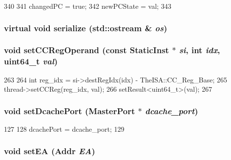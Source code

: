 \begin{DoxyCode}
340     {
341        changedPC = true;
342        newPCState = val;
343     }
\end{DoxyCode}
\hypertarget{classCheckerCPU_ad6272f80ae37e8331e3969b3f072a801}{
\subsubsection[{serialize}]{\setlength{\rightskip}{0pt plus 5cm}virtual void serialize (std::ostream \& {\em os})}}
\label{classCheckerCPU_ad6272f80ae37e8331e3969b3f072a801}
\hypertarget{classCheckerCPU_afeb2b876cf6b29215cf9d6d56ba8863b}{
\subsubsection[{setCCRegOperand}]{\setlength{\rightskip}{0pt plus 5cm}void setCCRegOperand (const {\bf StaticInst} $\ast$ {\em si}, \/  int {\em idx}, \/  uint64\_\-t {\em val})}}
\label{classCheckerCPU_afeb2b876cf6b29215cf9d6d56ba8863b}



\begin{DoxyCode}
263     {
264         int reg_idx = si->destRegIdx(idx) - TheISA::CC_Reg_Base;
265         thread->setCCReg(reg_idx, val);
266         setResult<uint64_t>(val);
267     }
\end{DoxyCode}
\hypertarget{classCheckerCPU_a8d77cc755c7a424f4eb80130fb627012}{
\subsubsection[{setDcachePort}]{\setlength{\rightskip}{0pt plus 5cm}void setDcachePort ({\bf MasterPort} $\ast$ {\em dcache\_\-port})}}
\label{classCheckerCPU_a8d77cc755c7a424f4eb80130fb627012}



\begin{DoxyCode}
127 {
128     dcachePort = dcache_port;
129 }
\end{DoxyCode}
\hypertarget{classCheckerCPU_a2f9742f8d2bcf6a31ebfc121fd9d5fbc}{
\subsubsection[{setEA}]{\setlength{\rightskip}{0pt plus 5cm}void setEA ({\bf Addr} {\em EA})}}
\label{classCheckerCPU_a2f9742f8d2bcf6a31ebfc121fd9d5fbc}



